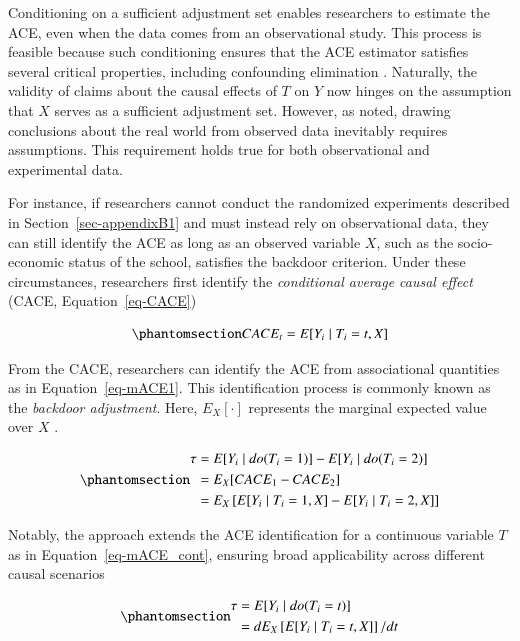 \documentclass[
  authoryear,
  review,
  1p]{elsarticle}
\begin{document}
Conditioning on a sufficient adjustment set enables researchers to
estimate the ACE, even when the data comes from an observational study.
This process is feasible because such conditioning ensures that the ACE
estimator satisfies several critical properties, including confounding
elimination \citep{Morgan_et_al_2014}. Naturally, the validity of claims
about the causal effects of \(T\) on \(Y\) now hinges on the assumption
that \(X\) serves as a sufficient adjustment set. However, as
\citet[p.~150]{Kohler_et_al_2019} noted, drawing conclusions about the
real world from observed data inevitably requires assumptions. This
requirement holds true for both observational and experimental data.

For instance, if researchers cannot conduct the randomized experiments
described in Section~\ref{sec-appendixB1} and must instead rely on
observational data, they can still identify the ACE as long as an
observed variable \(X\), such as the socio-economic status of the
school, satisfies the backdoor criterion. Under these circumstances,
researchers first identify the \emph{conditional average causal effect}
(CACE, Equation~\ref{eq-CACE})

\begin{equation}\phantomsection\label{eq-CACE}{
CACE_{t} = E[Y_{i} \mid T_{i}=t, X]
}\end{equation}

From the CACE, researchers can identify the ACE from associational
quantities as in Equation~\ref{eq-mACE1}. This identification process is
commonly known as the \emph{backdoor adjustment}. Here, \(E_{X}[\cdot]\)
represents the marginal expected value over \(X\)
\citep{Morgan_et_al_2014}.

\begin{equation}\phantomsection\label{eq-mACE1}{
\begin{aligned}
  \tau & = E[Y_{i} \mid do(T_{i}=1)]- E[Y_{i} \mid do(T_{i}=2)] \\
  & = E_{X}[CACE_{1} - CACE_{2}] \\
  & = E_{X}\left[ E[Y_{i} \mid T_{i}=1, X] - E[Y_{i} \mid T_{i}=2, X] \right]
\end{aligned}
}\end{equation}

Notably, the approach extends the ACE identification for a continuous
variable \(T\) as in Equation~\ref{eq-mACE_cont}, ensuring broad
applicability across different causal scenarios \citep[p.~45]{Neal_2020}

\begin{equation}\phantomsection\label{eq-mACE_cont}{
\begin{aligned}
  \tau &= E[Y_{i} \mid do(T_{i}=t)] \\
  & = d E_{X}\left[ E[Y_{i} \mid T_{i}=t, X]\right]/ dt
  \end{aligned}
}\end{equation}
\end{document}
